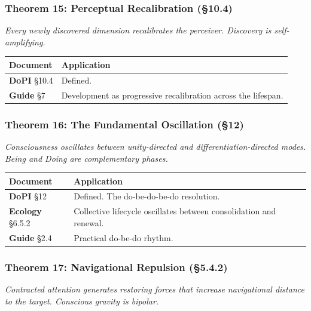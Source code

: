 \subsubsection*{Theorem 15: Perceptual Recalibration (§10.4)}


\textit{Every newly discovered dimension recalibrates the perceiver. Discovery is self-amplifying.}



\begin{longtable}{>{\raggedright\arraybackslash}p{} >{\raggedright\arraybackslash}p{}}
\toprule
\textbf{Document} & \textbf{Application} \\
\midrule
\endhead
\textbf{DoPI} §10.4 & Defined. \\
\textbf{Guide} §7 & Development as progressive recalibration across the lifespan. \\
\bottomrule
\end{longtable}



\subsubsection*{Theorem 16: The Fundamental Oscillation (§12)}


\textit{Consciousness oscillates between unity-directed and differentiation-directed modes. Being and Doing are complementary phases.}



\begin{longtable}{>{\raggedright\arraybackslash}p{} >{\raggedright\arraybackslash}p{}}
\toprule
\textbf{Document} & \textbf{Application} \\
\midrule
\endhead
\textbf{DoPI} §12 & Defined. The do-be-do-be-do resolution. \\
\textbf{Ecology} §6.5.2 & Collective lifecycle oscillates between consolidation and renewal. \\
\textbf{Guide} §2.4 & Practical do-be-do rhythm. \\
\bottomrule
\end{longtable}



\subsubsection*{Theorem 17: Navigational Repulsion (§5.4.2)}


\textit{Contracted attention generates restoring forces that increase navigational distance to the target. Conscious gravity is bipolar.}



